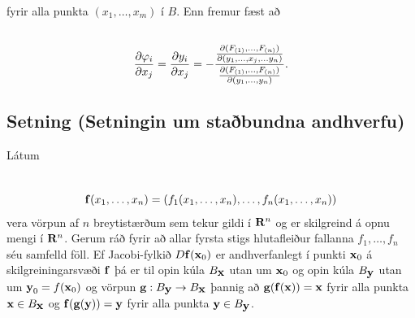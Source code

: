 \documentclass[a4paper,10pt,icelandic]{sphinxmanual}
\begin{document}
fyrir alla punkta \((x_1,\ldots,x_m)\) í \(B\). Enn fremur fæst
að
\begin{gather}
\begin{split}\displaystyle\end{split}\notag\\\begin{split}\frac{\partial \varphi_i}{\partial x_j}
=\frac{\partial y_i}{\partial x_j}
=-\frac{\frac{\partial(F_{(1)}, \ldots, F_{(n)})}
{\partial( y_1, \ldots,x_j,\ldots y_n)}}
{\frac{\partial(F_{(1)}, \ldots, F_{(n)})}{\partial( y_1, \ldots, y_n)}}.\end{split}\notag
\end{gather}

\subsection{Setning (Setningin um staðbundna andhverfu)}
\label{Kafli2:index-29}\label{Kafli2:setning-setningin-um-stabundna-andhverfu}
\begin{DUlineblock}{0em}
\item[] Látum
\end{DUlineblock}
\begin{gather}
\begin{split}\displaystyle\end{split}\notag\\\begin{split}\mbox{${\bf f}$}(x_1,\ldots,
x_n)=(f_1(x_1,\ldots,x_n),\ldots,f_n(x_1,\ldots,x_n))\end{split}\notag
\end{gather}
vera vörpun af \(n\) breytistærðum sem tekur gildi í
\(\mbox{${\bf R}^n$}\) og er skilgreind á opnu mengi í
\(\mbox{${\bf R}^n$}\). Gerum ráð fyrir að allar fyrsta stigs
hlutafleiður fallanna \(f_1, \ldots, f_n\) séu samfelld föll. Ef
Jacobi-fylkið \(D\mbox{${\bf f}$}(\mbox{${\bf x}$}_0)\) er
andhverfanlegt í punkti \(\mbox{${\bf x}$}_0\) á skilgreiningarsvæði
\(\mbox{${\bf f}$}\) þá er til opin kúla
\(B_{\mbox{${\bf x}$}}\) utan um \(\mbox{${\bf x}$}_0\) og opin
kúla \(B_{\mbox{${\bf y}$}}\) utan um
\(\mbox{${\bf y}$}_0=f(\mbox{${\bf x}$}_0)\) og vörpun
\textbar{} \(\mbox{${\bf g}$}:B_{\mbox{${\bf y}$}}\rightarrow B_{\mbox{${\bf x}$}}\)
þannig að
\(\mbox{${\bf g}$}(\mbox{${\bf f}$}(\mbox{${\bf x}$}))=\mbox{${\bf x}$}\)
fyrir alla punkta \(\mbox{${\bf x}$}\in B_{\mbox{${\bf x}$}}\) og
\(\mbox{${\bf f}$}(\mbox{${\bf g}$}(\mbox{${\bf y}$}))=\mbox{${\bf y}$}\)
fyrir alla punkta \(\mbox{${\bf y}$}\in B_{\mbox{${\bf y}$}}\).
\end{document}
